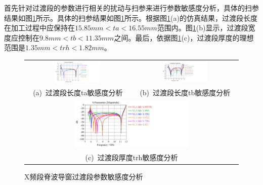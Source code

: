 \documentclass[master]{thesis-uestc}
\begin{document}
首先针对过渡段的参数进行相关的扰动与扫参来进行参数敏感度分析，具体的扫参结果如图\ref{fig:X频段脊波导窗过渡段参数敏感度分析}所示。具体的扫参结果如图\ref{fig:X频段脊波导窗过渡段参数敏感度分析}所示。根据图\ref{fig:X频段脊波导窗过渡段参数敏感度分析}(a)的仿真结果，过渡段长度在加工过程中应保持在\(15.85mm<ta<16.55mm\)范围内。图\ref{fig:X频段脊波导窗过渡段参数敏感度分析}(b)显示，过渡段宽度应控制在\(9.8mm<tb<11.35mm\)之间。最后，依据图\ref{fig:X频段脊波导窗过渡段参数敏感度分析}(c)，过渡段厚度的理想范围是\(1.35mm<trh<1.82mm\)。 
\begin{figure}[!htbp]
    \small
    \centering
    \begin{tabular}{@{\ }c@{\ }c}
        \includegraphics[width=0.45\textwidth]{pic/chapter3/脊波导窗过渡段长度ta扫参.png} & 
        \hspace{5pt}
        \includegraphics[width=0.45\textwidth]{pic/chapter3/脊波导窗过渡段宽度tb扫参.png}     \\
        \mbox{\small (a) 过渡段长度ta敏感度分析}                                                                               & 
        \mbox{\small (b) 过渡段长度tb敏感度分析}                                                                                  \\[6bp]
        \multicolumn{2}{c}{\includegraphics[width=0.55\textwidth]{pic/chapter3/脊波导窗过渡段厚度trh扫参.png}} \\  %
        \multicolumn{2}{c}{\mbox{\small (c) 过渡段厚度trh敏感度分析}}
    \end{tabular}
    \caption{X频段脊波导窗过渡段参数敏感度分析}
    \label{fig:X频段脊波导窗过渡段参数敏感度分析}
\end{figure}
\end{document}
